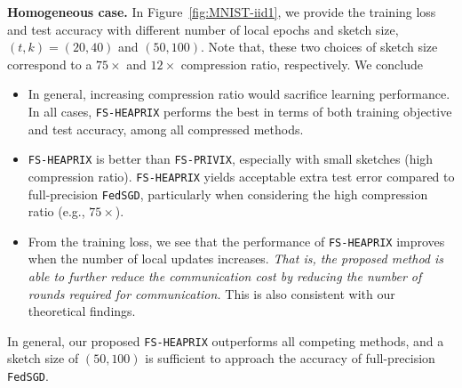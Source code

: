 \documentclass[11pt]{article}
\begin{document}
\textbf{Homogeneous case.} In Figure~\ref{fig:MNIST-iid1}, we provide the training loss and test accuracy with different number of local epochs and sketch size, $(t,k)=(20,40)$ and $(50,100)$. 
Note that, these two choices of sketch size correspond to a $75\times$ and $12\times$ compression ratio, respectively. We conclude
\begin{itemize}
    \item In general, increasing compression ratio would sacrifice learning performance. In all cases, \texttt{FS-HEAPRIX} performs the best in terms of both training objective and test accuracy, among all compressed methods.
    
    \item \texttt{FS-HEAPRIX} is better than \texttt{FS-PRIVIX}, especially with small sketches (high compression ratio). \texttt{FS-HEAPRIX} yields acceptable extra test error compared to full-precision \texttt{FedSGD}, particularly when considering the high compression ratio (e.g., $75\times$). 
    
    \item From the training loss, we see that the performance of \texttt{FS-HEAPRIX} improves when the number of local updates increases. \emph{That is, the proposed method is able to further reduce the communication cost by reducing the number of rounds required for communication.} This is also consistent with our theoretical findings. 
\end{itemize}
In general, our proposed \texttt{FS-HEAPRIX} outperforms all competing methods, and a sketch size of $(50,100)$ is sufficient to approach the accuracy of full-precision \texttt{FedSGD}.
\end{document}
